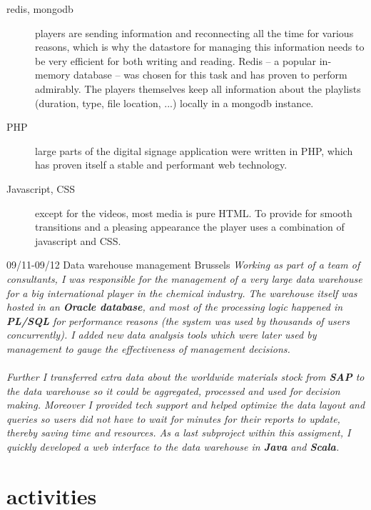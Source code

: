 \documentclass[]{friggeri-cv}
\begin{document}
\begin{entrylist}
{{\begin{description}
        \item[redis, mongodb] players are sending information and reconnecting all the time for various reasons, which is why the datastore for managing this information needs to be very efficient for both writing and reading. Redis -- a popular in-memory database -- was chosen for this task and has proven to perform admirably. The players themselves keep all information about the playlists (duration, type, file location, ...) locally in a mongodb instance.
        \item[PHP] large parts of the digital signage application were written in PHP, which has proven itself a stable and performant web technology.
        \item[Javascript, CSS] except for the videos, most media is pure HTML. To provide for smooth transitions and a pleasing appearance the player uses a combination of javascript and CSS.
    \end{description}
    }}
\end{entrylist}

\begin{entrylist}
  \entry
    {09/11-09/12}
    {Data warehouse management}
    {Brussels}
    {\emph{
    Working as part of a team of consultants, I was responsible for the management of a very large data warehouse for a big international player in the chemical industry. The warehouse itself was hosted in an \textbf{Oracle database}, and most of the processing logic happened in \textbf{PL/SQL} for performance reasons (the system was used by thousands of users concurrently). I added new data analysis tools which were later used by management to gauge the effectiveness of management decisions. \\\\ Further I transferred extra data about the worldwide materials stock from \textbf{SAP} to the data warehouse so it could be aggregated, processed and used for decision making. Moreover I provided tech support and helped optimize the data layout and queries so users did not have to wait for minutes for their reports to update, thereby saving time and resources. As a last subproject within this assigment, I quickly developed a web interface to the data warehouse in \textbf{Java} and \textbf{Scala}.
    }}
\end{entrylist}

\section{activities}
\end{document}
